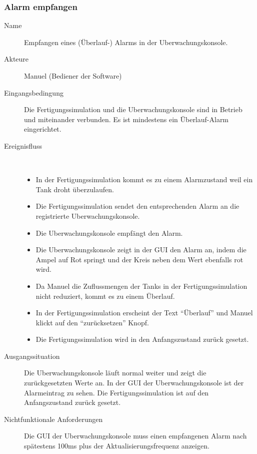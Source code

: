 \documentclass[parskip=full]{scrartcl}
\begin{document}
\subsubsection{Alarm empfangen}
\begin{description}
  \item[Name] Empfangen eines (Überlauf-) Alarms in der \gls{Uberwachungskonsole}.
  \item[Akteure] Manuel (Bediener der Software)
  \item[Eingangsbedingung] Die \gls{Fertigungssimulation} und die \gls{Uberwachungskonsole} sind in Betrieb und miteinander verbunden.
    Es ist mindestens ein Überlauf-Alarm eingerichtet.
  \item[Ereignisfluss]~\\
  \begin{itemize}[noitemsep]
    \item In der \gls{Fertigungssimulation} kommt es zu einem Alarmzustand weil ein Tank droht überzulaufen.
    \item Die \gls{Fertigungssimulation} sendet den entsprechenden Alarm an die registrierte \gls{Uberwachungskonsole}.
    \item Die \gls{Uberwachungskonsole} empf\"angt den Alarm.
    \item Die \gls{Uberwachungskonsole} zeigt in der \gls{GUI} den Alarm an, indem die Ampel auf Rot springt und der Kreis neben dem Wert ebenfalls rot wird.
    \item Da Manuel die Zuflussmengen der Tanks in der \gls{Fertigungssimulation} nicht reduziert, kommt es zu einem Überlauf.
    \item In der \gls{Fertigungssimulation} erscheint der Text "`Überlauf"' und Manuel klickt auf den "`zurücksetzen"' Knopf.
    \item Die Fertigungssimulation wird in den Anfangszustand zurück gesetzt.
  \end{itemize}
  \item[Ausgangssituation] Die \gls{Uberwachungskonsole} läuft normal weiter und zeigt die zurückgesetzten Werte an. In der \gls{GUI} der
    \gls{Uberwachungskonsole} ist der Alarmeintrag zu sehen. Die \gls{Fertigungssimulation} ist auf den Anfangszustand zurück gesetzt.
  \item [Nichtfunktionale Anforderungen] Die \gls{GUI} der \gls{Uberwachungskonsole} muss einen empfangenen Alarm nach sp\"atestens
    100ms plus der Aktualisierungsfrequenz anzeigen.
\end{description}
\end{document}

